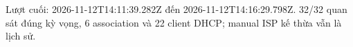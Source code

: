 Lượt cuối: 2026-11-12T14:11:39.282Z đến 2026-11-12T14:16:29.798Z. 32/32 quan sát đúng kỳ vọng, 6 association và 22 client DHCP; manual ISP kế thừa vẫn là lịch sử.
